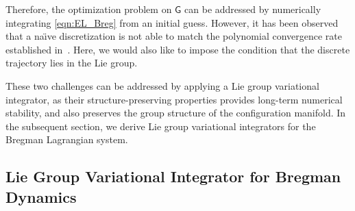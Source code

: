 \documentclass[letterpaper, 10pt, conference]{ieeeconf}
\newcommand{\G}{\ensuremath{\mathsf{G}}}
\begin{document}
Therefore, the optimization problem on $\G$ can be addressed by numerically integrating \eqref{eqn:EL_Breg} from an initial guess. 
However, it has been observed that a na\"\i ve discretization is not able to match the polynomial convergence rate established in~\cite{wibisono2016variational}.
Here, we would also like to impose the condition that the discrete trajectory lies in the Lie group.

These two challenges can be addressed by applying a Lie group variational integrator, 
as their structure-preserving properties provides long-term numerical stability, and also preserves the group structure of the configuration manifold. 
In the subsequent section, we derive Lie group variational integrators for the Bregman Lagrangian system. 

\subsection{Lie Group Variational Integrator for Bregman Dynamics}
\end{document}
